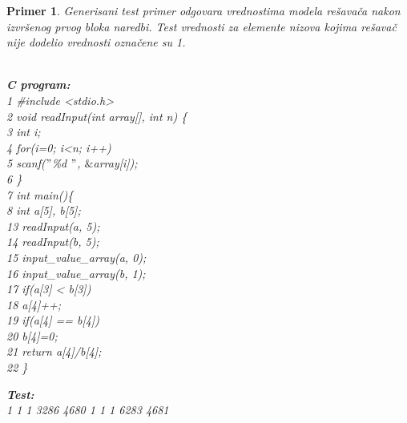 \documentclass[12pt,oneside]{memoir}
\newcommand\tab[1][0.5cm]{\hspace*{#1}}
\newtheorem{primer}{Primer}
\begin{document}
\begin{primer} Generisani test primer odgovara vrednostima modela rešavača nakon izvršenog prvog bloka naredbi. Test vrednosti za elemente nizova kojima rešavač nije dodelio vrednosti označene su 1.\\ \\
\hspace{-0.6cm} \label{example24}
\begin{minipage}[b]{0.5\textwidth}
\textbf{C program:}\\
1 \hspace{0.1cm} \#include <stdio.h> \\
2 \hspace{0.1cm} void readInput(int array[], int n) \{ \\
3	\hspace{0.15cm} \tab int i; \\
4	\hspace{0.15cm} \tab for(i=0; i<n; i++) \\
5	\hspace{0.15cm} \tab \tab	scanf($"$\%d $"$, $\&$array[i]); \\
6 \hspace{0.1cm} \} \\
7 \hspace{0.1cm} int main()\{ \\
8	\hspace{0.15cm} \tab int a[5], b[5];\\
13  \hspace{-0.08cm} \tab readInput(a, 5); \\
14  \hspace{-0.08cm} \tab readInput(b, 5); \\
15	\hspace{-0.08cm} \tab input\_value\_array(a, 0); \\
16	\hspace{-0.08cm} \tab input\_value\_array(b, 1); \\
17  \hspace{-0.08cm} \tab if(a[3] < b[3]) \\
18	\hspace{-0.08cm} \tab \tab	a[4]++; \\
19	\hspace{-0.08cm} \tab if(a[4] == b[4]) \\
20	\hspace{-0.08cm} \tab \tab	b[4]=0; \\
21	\hspace{-0.08cm} \tab return a[4]/b[4]; \\
22 \}
\end{minipage}
\hspace{1.1cm}
\begin{minipage}[t]{0.4\textwidth}
\vspace{-11.8cm}
\textbf{Test:}\\
1 1 1 3286 4680 1 1 1 6283 4681
\end{minipage}
\end{primer}
\end{document}

